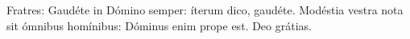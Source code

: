 Fratres: Gaudéte in Dómino semper: íterum dico, gaudéte. Modéstia vestra nota sit ómnibus homínibus: Dóminus enim prope est.
\rubric{\Rbar} Deo grátias.
